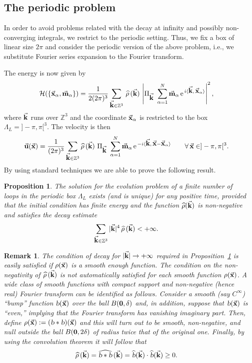 \documentclass[a4paper,11pt]{article}
\numberwithin{equation}{section}
\newtheorem{proposition}{Proposition}
\newtheorem{remark}{Remark}
\newcommand{\Z}{\mathbb{Z}}
\newcommand{\la}{\langle}
\newcommand{\ra}{\rangle}
\newcommand{\U}{\mbox{$\vec{\bf u}$}}
\renewcommand{\k}{\mbox{$\vec{\bf k}$}}
\newcommand{\x}{\mbox{$\vec{\bf x}$}}
\newcommand{\m}{\mbox{$\vec{\bf m}$}}
\begin{document}
\subsection{The periodic problem}
In order to avoid problems related with the decay at infinity and
possibly non-converging integrals, we restrict to the periodic
setting. Thus, we fix a box of linear size $2\pi$ and consider the
periodic version of the above problem, i.e., we substitute Fourier
series expansion to the Fourier transform.\par
%
The energy is now given by
\begin{equation*}
  \mathcal{H}(\{\x_\alpha,\m_\alpha\}) = \frac{1}{2(2\pi)^3}\sum_{\k\in\Z^3}
  \,\widehat{\rho}\,(\k)\, 
  \left|\Pi_{\k}\ \sum_{\alpha=1}^N \m_\alpha \,\text{e}^{\,i\la \k,\,
  \x_\alpha\ra} \right|^2, 
\end{equation*}
where $\k$ runs over $\Z^3$ and the coordinate $\x_\alpha$ is
restricted to the box $\Lambda_L = ]-\pi,\pi[^3$. The velocity is then 
\begin{equation*}%
\U(\x)=\frac{1}{(2\pi)^3}\sum_{\k\in\Z^3}\widehat{\rho}\,(\k)\
\Pi_{\k}\ \sum_{\alpha=1}^N \m_\alpha \,\text{e}^{\,-i\la
  \k,\,\x-\x_\alpha\ra}\qquad \forall\,\x \in ]-\pi,\pi[^3.    
\end{equation*}
%
By using standard techniques we are able to prove the following
result.
\begin{proposition}\label{bump}
The solution for the evolution problem of a finite number of loops in
the periodic box $\Lambda_L$ exists (and is unique) for any positive
time, provided that the initial condition has finite energy and the
function $\widehat\rho(\k)$ is non-negative and satisfies the decay
estimate  
$$
\sum_{\k\in\Z^3} |\k|^4\, \widehat{\rho}\,(\k) < +\infty.
$$   
\end{proposition}
\begin{remark}
The condition of decay for $|\k|\to+\infty$ required in
Proposition~\ref{bump} is easily satisfied if $\rho(\x)$ is a smooth
enough function. The condition on the non-negativity of
$\widehat{\rho}\,(\k)$ is not 
automatically satisfied for each smooth function $\rho(\x)$. A wide
class of smooth functions with compact support and non-negative (hence
real) Fourier transform can be identified as follows. Consider a
smooth (say $C^\infty$) ``bump'' function $\textsl{b}(\x)$ over the
ball $B({\bf0},\delta)$ and, in addition, suppose that
$\textsl{b}(\x)$ is ``even,'' implying that the Fourier transform has
vanishing imaginary part. Then, define
$\rho(\x):=(\textsl{b}*\textsl{b})(\x)$ and this 
will turn out to be smooth, non-negative, and null outside the ball
$B({\bf0},2\delta)$ of radius twice that of the original one. Finally,
by using the convolution theorem it will follow that 
$$
\widehat{\rho}\,(\k)=
\widehat{\textsl{b}\ast\textsl{b}}\,(\k)=
\widehat{\textsl{b}}(\k)\cdot\widehat{\textsl{b}}(\k)\geq 0.  
$$
\end{remark}
\end{document}
